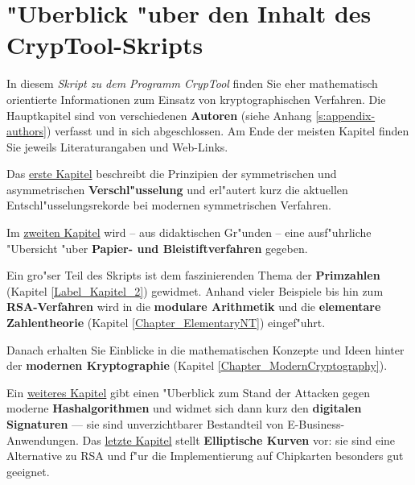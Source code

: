 
\section*{"Uberblick "uber den Inhalt des CrypTool-Skripts}

\parskip 4pt
{
In diesem {\em Skript zu dem Programm CrypTool}  finden Sie
eher mathematisch orientierte Informationen zum Einsatz von
kryptographischen Verfahren. Die Hauptkapitel sind von
verschiedenen {\bf Autoren} (siehe Anhang \ref{s:appendix-authors})
verfasst und in sich abgeschlossen. Am Ende der meisten Kapitel finden Sie
jeweils Literaturangaben und Web-Links.

Das \hyperlink{Kapitel_1}{erste Kapitel} beschreibt die Prinzipien der
symmetrischen und asymmetrischen {\bf Verschl"usselung} und erl"autert 
kurz die aktuellen Entschl"usselungsrekorde bei modernen symmetrischen
Verfahren.

Im \hyperlink{Kapitel_PaperandPencil}{zweiten Kapitel} wird -- aus 
didaktischen Gr"unden -- eine ausf"uhrliche "Ubersicht
"uber {\bf Papier- und Bleistiftverfahren} gegeben.

Ein gro"ser Teil des Skripts ist dem faszinierenden Thema der
{\bf Primzahlen} (Kapitel \ref{Label_Kapitel_2})
gewidmet.
Anhand vieler Beispiele bis hin zum {\bf RSA-Verfahren} wird in die
{\bf modulare Arithmetik} und die 
{\bf elementare Zahlentheorie} (Kapitel \ref{Chapter_ElementaryNT})
eingef"uhrt.

Danach erhalten Sie Einblicke in die mathematischen Konzepte und
Ideen hinter der
{\bf modernen Kryptographie} (Kapitel \ref{Chapter_ModernCryptography}).

Ein \hyperlink{Chapter_Hashes-and-Digital-Signatures}{weiteres Kapitel} gibt
einen "Uberblick zum Stand der Attacken gegen moderne {\bf Hashalgorithmen}
und widmet sich dann kurz den {\bf digitalen Signaturen}
 --- sie sind unverzichtbarer Bestandteil von E-Business-Anwendungen.
Das \hyperlink{ellcurve}{letzte Kapitel} stellt {\bf Elliptische Kurven} vor:
sie sind eine Alternative zu RSA und f"ur die Implementierung auf Chipkarten
besonders gut geeignet.

}
